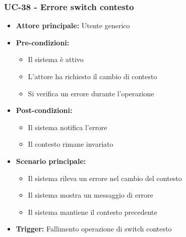 \documentclass[a4paper,12pt]{article}
\begin{document}
\subsubsection{UC-38 - Errore switch contesto} \label{sec:UC-38}
\begin{itemize}
    \item \textbf{Attore principale:} Utente generico
    \item \textbf{Pre-condizioni:}
    \begin{itemize}
        \item Il sistema è attivo
        \item L'attore ha richiesto il cambio di contesto
        \item Si verifica un errore durante l'operazione
    \end{itemize}
    \item \textbf{Post-condizioni:}
    \begin{itemize}
        \item Il sistema notifica l'errore
        \item Il contesto rimane invariato
    \end{itemize}
    \item \textbf{Scenario principale:}
    \begin{itemize}
        \item Il sistema rileva un errore nel cambio del contesto
        \item Il sistema mostra un messaggio di errore
        \item Il sistema mantiene il contesto precedente
    \end{itemize}
    \item \textbf{Trigger:} Fallimento operazione di switch contesto
\end{itemize}
\end{document}

